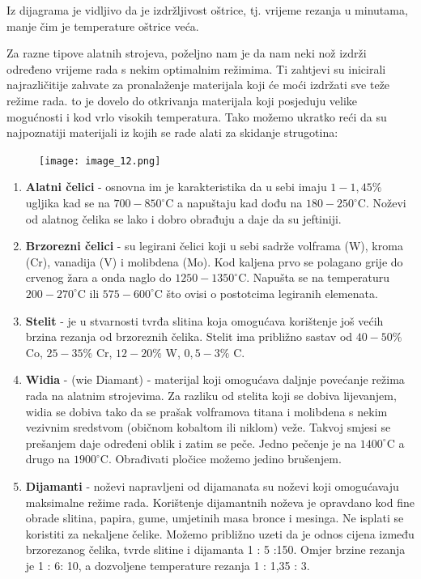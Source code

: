 \documentclass[a4paper,12pt]{article}
\numberwithin{figure}{section}
\begin{document}
Iz dijagrama je vidljivo da je izdržljivost oštrice, tj. vrijeme rezanja u minutama, manje čim je temperature oštrice veća.\par 
Za razne tipove alatnih strojeva, poželjno nam je da nam neki nož izdrži određeno vrijeme rada s nekim optimalnim režimima. Ti zahtjevi su inicirali najrazličitije zahvate za pronalaženje materijala koji će moći izdržati sve teže režime rada. to je dovelo do otkrivanja materijala koji posjeduju velike mogućnosti i kod vrlo visokih temperatura. Tako možemo ukratko reći da su najpoznatiji materijali iz kojih se rade alati za skidanje strugotina:
\begin{figure}[!h]
\centering
\texttt{[image: image\_12.png]}
\end{figure}
\FloatBarrier
\begin{enumerate}
\item \textbf{Alatni čelici} - osnovna im je karakteristika da u sebi imaju $1-1,45\%$ ugljika kad se na $700 - 850^{\circ}$C a napuštaju kad dođu na $180 - 250^{\circ}$C. Noževi od alatnog čelika se lako i dobro obrađuju a daje da su jeftiniji.
\item \textbf{Brzorezni čelici} - su legirani čelici koji u sebi sadrže volframa (W), kroma (Cr), vanadija (V) i molibdena (Mo). Kod kaljena prvo se polagano grije do crvenog žara a onda naglo do $1250 - 1350^{\circ}$C. Napušta se na temperaturu $200 - 270^{\circ}$C ili $575 - 600^{\circ}$C što ovisi o postotcima legiranih elemenata.
\item \textbf{Stelit} - je u stvarnosti tvrđa slitina koja omogućava korištenje još većih brzina rezanja od brzoreznih čelika. Stelit ima približno sastav od $40-50\%$ Co, $25 - 35\%$ Cr, $12 - 20\%$ W, $0,5-3\%$ C.
\item \textbf{Widia} - (wie Diamant) - materijal koji omogućava daljnje povećanje režima rada na alatnim strojevima. Za razliku od stelita koji se dobiva lijevanjem, widia se dobiva tako da se prašak volframova titana i molibdena s nekim vezivnim sredstvom (običnom kobaltom ili niklom) veže. Takvoj smjesi se prešanjem daje određeni oblik i zatim se peče. Jedno pečenje je na $1400^{\circ}$C a drugo na $1900^{\circ}$C. Obrađivati pločice možemo jedino brušenjem.
\item \textbf{Dijamanti} - noževi napravljeni od dijamanata su noževi koji omogućavaju maksimalne režime rada. Korištenje dijamantnih noževa je opravdano kod fine obrade slitina, papira, gume, umjetinih masa bronce i mesinga. Ne isplati se koristiti za nekaljene čelike. Možemo približno uzeti da je odnos cijena između brzorezanog čelika, tvrde slitine i dijamanta 1 : 5 :150. Omjer brzine rezanja je 1 : 6: 10, a dozvoljene temperature rezanja 1 : 1,35 : 3.\par

\end{enumerate}
\end{document}
